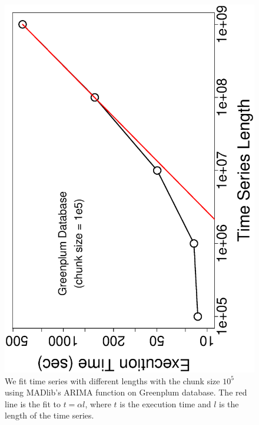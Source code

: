 \documentclass[english,10pt]{llncs}
\begin{document}
\begin{figure}[ht]
  \begin{centering}
    \includegraphics[angle=-90,scale=0.4]{gp_time_vs_size}
  \end{centering}
  \caption{\label{fig:gp_time_size} We fit time series with different
    lengths with the chunk size $10^5$ using MADlib's ARIMA function
    on Greenplum database. The red line is the fit to $t = \alpha l$,
    where $t$ is the execution time and $l$ is the length of the time
    series.}
\end{figure}
\end{document}
